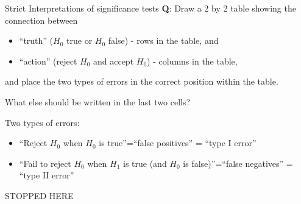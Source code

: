 \documentclass[
  ignorenonframetext,
]{beamer}
\providecommand{\tightlist}{%
  \setlength{\itemsep}{0pt}\setlength{\parskip}{0pt}}
\begin{document}
\begin{frame}{Strict Interpretations of significance tests}
\label{strict-interpretations-of-significance-tests}
\textbf{Q}: Draw a 2 by 2 table showing the connection between

\begin{itemize}
\tightlist
\item
  ``truth'' (\(H_0\) true or \(H_0\) false) - rows in the table, and
\item
  ``action'' (reject \(H_0\) and accept \(H_0\)) - columns in the table,
\end{itemize}

and place the two types of errors in the correct position within the
table.

What else should be written in the last two cells?
\end{frame}

\begin{frame}{Two types of errors:}
\label{two-types-of-errors}
\begin{itemize}
\item
  ``Reject \(H_0\) when \(H_0\) is true''=``false positives'' = ``type I
  error''
\item
  ``Fail to reject \(H_0\) when \(H_1\) is true (and \(H_0\) is
  false)''=``false negatives'' = ``type II error''
\end{itemize}
\end{frame}

\begin{frame}{STOPPED HERE}
\label{stopped-here}
\end{frame}
\end{document}
